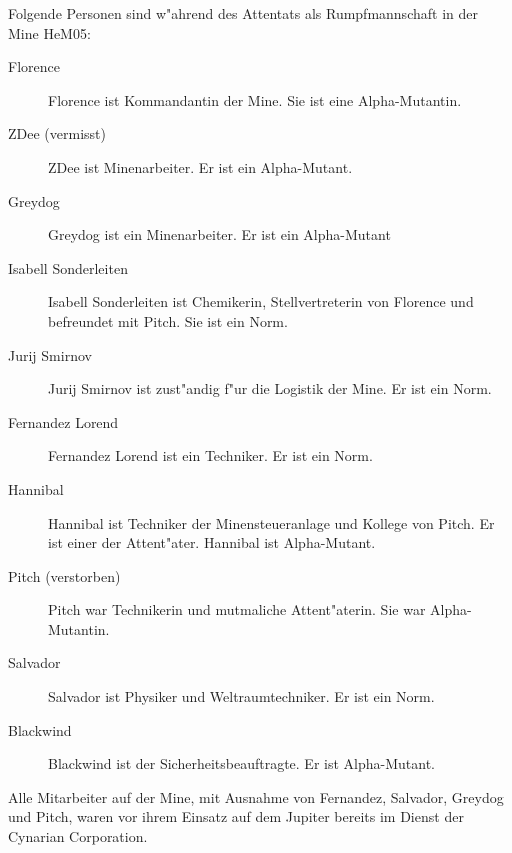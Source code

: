 
Folgende Personen sind w"ahrend des Attentats als Rumpfmannschaft in der Mine HeM05:

\begin{description}
    \item[Florence] Florence ist Kommandantin der Mine. Sie ist eine Alpha-Mutantin.
    \item[ZDee (vermisst)] ZDee ist Minenarbeiter. Er ist ein Alpha-Mutant.
    \item[Greydog] Greydog ist ein Minenarbeiter. Er ist ein Alpha-Mutant
    \item[Isabell Sonderleiten] Isabell Sonderleiten ist Chemikerin, Stellvertreterin von Florence und befreundet mit Pitch. Sie ist ein 
        Norm.
    \item[Jurij Smirnov] Jurij Smirnov ist zust"andig f"ur die Logistik der Mine. Er ist ein Norm.
    \item[Fernandez Lorend] Fernandez Lorend ist ein Techniker. Er ist ein Norm.
    \item[Hannibal] Hannibal ist Techniker der Minensteueranlage und Kollege von Pitch. Er ist einer der Attent"ater. Hannibal ist 
        Alpha-Mutant.
    \item[Pitch (verstorben)] Pitch war Technikerin und mutma\3liche Attent"aterin. Sie war Alpha-Mutantin.
    \item[Salvador] Salvador ist Physiker und Weltraumtechniker. Er ist ein Norm.
    \item[Blackwind] Blackwind ist der Sicherheitsbeauftragte. Er ist Alpha-Mutant.
\end{description}

Alle Mitarbeiter auf der Mine, mit Ausnahme von Fernandez, Salvador, Greydog und Pitch, waren vor ihrem Einsatz auf dem Jupiter bereits im Dienst der Cynarian Corporation.
